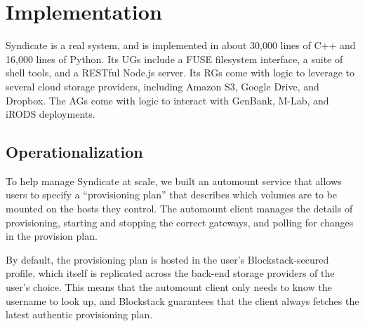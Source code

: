 \section{Implementation}
\label{sec:implementation}

Syndicate is a real system, and is implemented in about 30,000 lines of C++ and
16,000 lines of Python. Its UGs include a FUSE filesystem interface, a suite of
shell tools, and a RESTful Node.js server. Its RGs come with logic to leverage
to several cloud storage providers, including Amazon S3, Google Drive, and
Dropbox. The AGs come with logic to interact with GenBank, M-Lab, and iRODS
deployments.

\subsection{Operationalization}

To help manage Syndicate at scale, we built an automount service that allows
users to specify a ``provisioning plan'' that describes which volumes are
to be mounted on the hosts they control. The automount client manages the
details of provisioning, starting and stopping the correct gateways, and polling
for changes in the provision plan.

By default, the provisioning plan is hosted in the user's Blockstack-secured
profile, which itself is replicated across the back-end storage providers of the
user's choice.  This means that the automount client only needs to know
the username to look up, and Blockstack guarantees that the client always
fetches the latest authentic provisioning plan.

